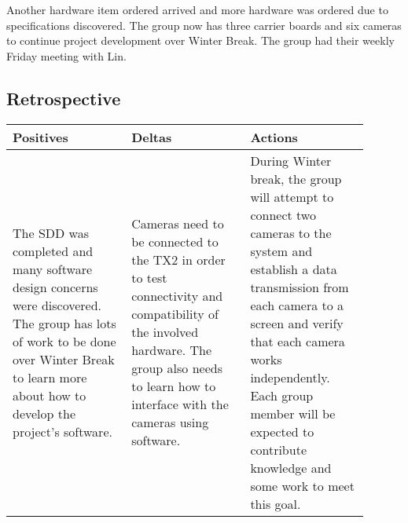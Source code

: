 \documentclass[letterpaper,10pt,serif,draftclsnofoot,onecolumn,compsoc,titlepage]{IEEEtran}
\begin{document}
Another hardware item ordered arrived and more hardware was ordered due to 
specifications discovered. The group now has three carrier boards and six cameras to 
continue project development over Winter Break. The group had their weekly Friday 
meeting with Lin.\\

\subsection{Retrospective}

\begin{tabular}{|p{0.3\linewidth}|p{0.3\linewidth}|p{0.3\linewidth}|}
   \hline
   \textbf{Positives} & \textbf{Deltas} & \textbf{Actions}\\ 
   \hline
   The SDD was completed and many software design concerns were discovered. The group 
   has lots of work to be done over Winter Break to learn more about how to develop 
   the project's software.  
   & 
   Cameras need to be connected to the TX2 in order to test connectivity and compatibility of the involved hardware. The group also needs to learn how to interface with the cameras using software.
   & 
   During Winter break, the group will attempt to connect two cameras to the system and establish a data transmission from each camera to a screen and verify that each camera works independently. Each group member will be expected to contribute knowledge and some work to meet this goal.
   \\
   \hline
\end{tabular}


\nocite{*}
\end{document}
